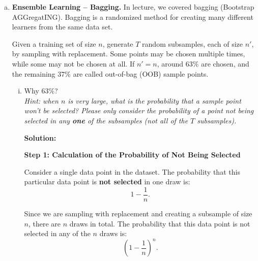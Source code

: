 \documentclass{article}
\newenvironment{solution}{\color{blue} \smallskip \textbf{Solution:}}{}
\begin{document}
\begin{enumerate}[(a)]
\begin{solution}
2. If \( \rho \) is very small (\( |\rho| \approx 0 \)). When \(\rho\) is close to 0, the variance becomes \(\frac{\sigma^2}{n}\), which decreases as \( n \) increases. This is the ideal case for averaging, as uncorrelated variables contribute to a significant reduction in variance.

3. If \( \rho \) is middling (\( |\rho| \approx 0.5 \)). For intermediate values of \(\rho\), the variance reduction is partial. As \( n \) grows, the \((n - 1) \rho\) term contributes moderately to the variance, so averaging provides some reduction in variance, but not as effectively as in the uncorrelated case.






    \end{solution}

    \newpage
    \item
    \textbf{Ensemble Learning – Bagging.} 
    In lecture, we covered bagging (Bootstrap AGGregatING). 
    Bagging is a randomized method for creating many different learners from the same data set.
    
    Given a training set of size $n$, generate $T$ random subsamples, each of size $n'$, by sampling with replacement. 
    Some points may be chosen multiple times, while some may not be chosen at all. 
    If $n' = n$, around $63\%$ are chosen, and the remaining $37\%$ are called out-of-bag (OOB) sample points.
    \begin{enumerate}[(i)]
    	\item Why $63\%$? \\
    	\textit{Hint: when $n$ is very large, what is the probability that a sample point won't be selected? Please only consider the probability of a point not being selected in any \textbf{one} of the subsamples (not all of the $T$ subsamples).}
    	
    	\begin{solution}



\textbf{Step 1: Calculation of the Probability of Not Being Selected}

Consider a single data point in the dataset. The probability that this particular data point is \textbf{not selected} in one draw is:
\[
1 - \frac{1}{n}.
\]

Since we are sampling with replacement and creating a subsample of size \( n \), there are \( n \) draws in total. The probability that this data point is not selected in any of the \( n \) draws is:
\[
\left(1 - \frac{1}{n}\right)^n.
\]\\


\end{solution}
\end{enumerate}
\end{enumerate}
\end{document}
